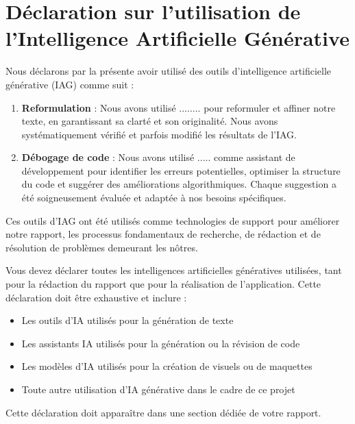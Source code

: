 \chapter*{Déclaration sur l'utilisation de l'Intelligence Artificielle Générative}
Nous déclarons par la présente avoir utilisé des outils d'intelligence artificielle générative (IAG) comme suit :
\begin{enumerate}
    \item \textbf{Reformulation} : Nous avons utilisé ........ pour reformuler et affiner notre texte, en garantissant sa clarté et son originalité. Nous avons systématiquement vérifié et parfois modifié les résultats de l'IAG.
    \item \textbf{Débogage de code} : Nous avons utilisé ..... comme assistant de développement pour identifier les erreurs potentielles, optimiser la structure du code et suggérer des améliorations algorithmiques. Chaque suggestion a été soigneusement évaluée et adaptée à nos besoins spécifiques.
\end{enumerate}

\par Ces outils d'IAG ont été utilisés comme technologies de support pour améliorer notre rapport, les processus fondamentaux de recherche, de rédaction et de résolution de problèmes demeurant les nôtres.

\begin{tcolorbox}[title=\textbf{Attention},    
colback=yellow!10,
    colframe=red!75!black,
    colbacktitle=red!85!black,
    coltitle=white,
    fonttitle=\large\bfseries,
    boxrule=0.5mm]
Vous devez déclarer toutes les intelligences artificielles génératives utilisées, tant pour la rédaction du rapport que pour la réalisation de l'application. Cette déclaration doit être exhaustive et inclure :
\begin{itemize}
   \item Les outils d'IA utilisés pour la génération de texte
   \item Les assistants IA utilisés pour la génération ou la révision de code
   \item Les modèles d'IA utilisés pour la création de visuels ou de maquettes
   \item Toute autre utilisation d'IA générative dans le cadre de ce projet
\end{itemize}
Cette déclaration doit apparaître dans une section dédiée de votre rapport.
\end{tcolorbox}
\thispagestyle{empty}
\strut